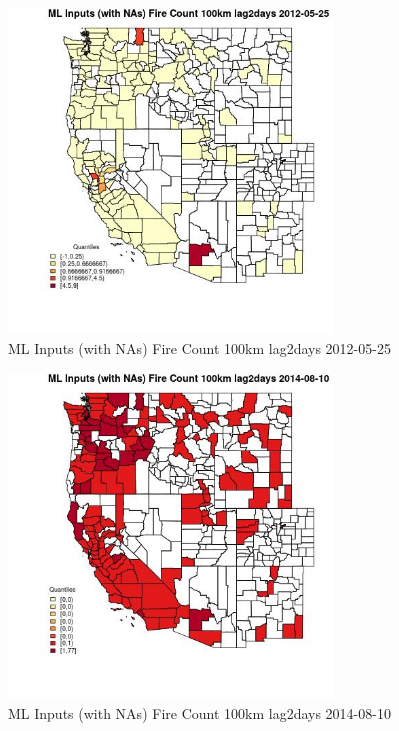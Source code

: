 \begin{figure} 
\centering  
\includegraphics[width=0.77\textwidth]{Code_Outputs/Report_ML_input_PM25_Step4_part_e_de_duplicated_aves_compiled_2019-05-18wNAs_CountyFire_Count_100km_lag2daysMean2012-05-25_2012-05-25.jpg} 
\caption{\label{fig:Report_ML_input_PM25_Step4_part_e_de_duplicated_aves_compiled_2019-05-18wNAsCountyFire_Count_100km_lag2daysMean2012-05-25_2012-05-25}ML Inputs (with NAs) Fire Count 100km lag2days 2012-05-25} 
\end{figure} 
 

\begin{figure} 
\centering  
\includegraphics[width=0.77\textwidth]{Code_Outputs/Report_ML_input_PM25_Step4_part_e_de_duplicated_aves_compiled_2019-05-18wNAs_CountyFire_Count_100km_lag2daysMean2014-08-10_2014-08-10.jpg} 
\caption{\label{fig:Report_ML_input_PM25_Step4_part_e_de_duplicated_aves_compiled_2019-05-18wNAsCountyFire_Count_100km_lag2daysMean2014-08-10_2014-08-10}ML Inputs (with NAs) Fire Count 100km lag2days 2014-08-10} 
\end{figure} 
 

